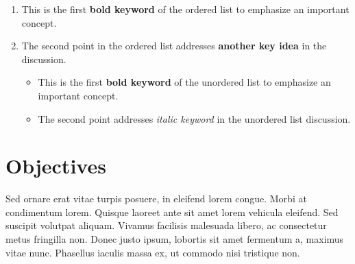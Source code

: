 \begin{enumerate}
	\item This is the first \textbf{bold keyword} of the ordered list to emphasize an important concept.
	\item The second point in the ordered list addresses \textbf{another key idea} in the discussion.
	      \begin{itemize} 	
	      	\item This is the first \textbf{bold keyword} of the unordered list to emphasize an important concept.
	      	\item The second point addresses \textit{italic keyword} in the unordered list discussion.
	      \end{itemize}
\end{enumerate}

\section{Objectives}
Sed ornare erat vitae turpis posuere, in eleifend lorem congue. Morbi at condimentum lorem. Quisque laoreet ante sit amet lorem vehicula eleifend. Sed suscipit volutpat aliquam. Vivamus facilisis malesuada libero, ac consectetur metus fringilla non. Donec justo ipsum, lobortis sit amet fermentum a, maximus vitae nunc. Phasellus iaculis massa ex, ut commodo nisi tristique non.